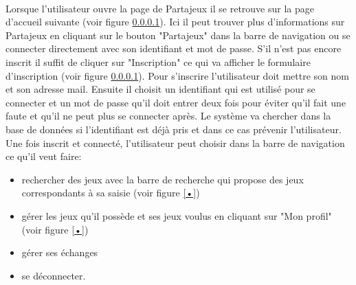 \documentclass[a4paper,12pt,abstracton,titlepage]{scrartcl}
\begin{document}
\paragraph{}
Lorsque l'utilisateur ouvre la page de Partajeux il se retrouve sur la page d'accueil suivante (voir figure \ref{}). Ici il peut trouver plus d'informations sur Partajeux en cliquant sur le bouton "Partajeux" dans la barre de navigation ou se connecter directement avec son identifiant et mot de passe. S'il n'est pas encore inscrit il suffit de cliquer sur "Inscription" ce qui va afficher le formulaire d'inscription (voir figure \ref{}). Pour s'inscrire l'utilisateur doit mettre son nom et son adresse mail. Ensuite il choisit un identifiant qui est utilisé pour se connecter et un mot de passe qu'il doit entrer deux fois pour éviter qu'il fait une faute et qu'il ne peut plus se connecter après. Le système va chercher dans la base de données si l'identifiant est déjà pris et dans ce cas prévenir l'utilisateur.
Une fois inscrit et connecté, l'utilisateur peut choisir dans la barre de navigation ce qu'il veut faire:
\begin{itemize}
\item rechercher des jeux avec la barre de recherche qui propose des jeux correspondants à sa saisie (voir figure \ref{•})
\item gérer les jeux qu'il possède et ses jeux voulus en cliquant sur "Mon profil" (voir figure \ref{•})
\item gérer ses échanges
\item se déconnecter.
\end{itemize}






\begin{minipage}[t]{0.5\textwidth}

	
  \end{minipage} 
\end{document}

